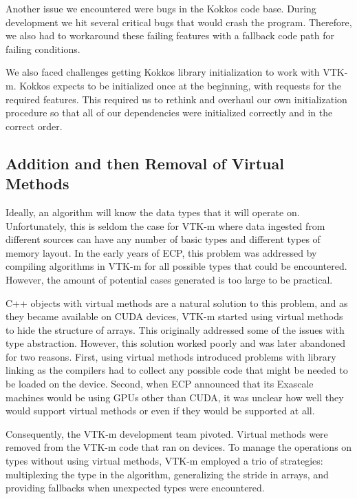Another issue we encountered were bugs in the Kokkos code base. During development we hit several critical bugs that would crash the program. Therefore, we also had to workaround these failing features with a fallback code path for failing conditions.

We also faced challenges getting Kokkos library initialization to work with VTK-m. Kokkos expects to be initialized once at the beginning, with requests for the required features. This required us to rethink and overhaul our own initialization procedure so that all of our dependencies were initialized correctly and in the correct order.

\subsection{Addition and then Removal of Virtual Methods}
\label{sec:virtual-methods}


Ideally, an algorithm
will know the data types that it will operate on.
Unfortunately, this is seldom the case for VTK-m where data ingested from different sources can have any number of basic types
and different types of memory layout.
In the early years of ECP, this problem was addressed by compiling algorithms in VTK-m for all possible types that could be encountered.
However, the amount of potential cases generated is too large to be practical.

C++ objects with virtual methods are a natural solution to this problem, and as they became available on CUDA devices, VTK-m started using virtual methods to hide the structure of arrays.
This originally addressed some of the issues with type abstraction.
However, this solution worked poorly and was later abandoned for two reasons.
First, using virtual methods introduced problems with library linking as the compilers had to collect any possible code that might be needed to be loaded on the device.
Second, when ECP announced that its Exascale machines would be using GPUs other than CUDA, it was unclear how well they would support virtual methods or even if they would be supported at all.

Consequently, the VTK-m development team pivoted.
Virtual methods were removed from the VTK-m code that ran on devices.
To manage the operations on types without using virtual methods, VTK-m employed a trio of strategies: multiplexing the type in the algorithm, generalizing the stride in arrays, and providing fallbacks when unexpected types were encountered.

